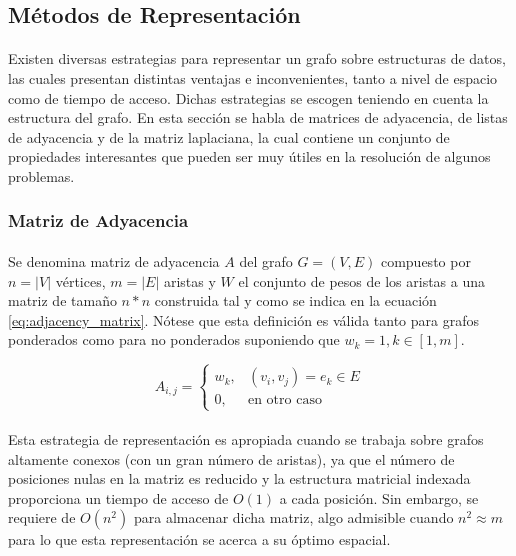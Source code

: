 \documentclass{subfiles}
\begin{document}
      \subsection{Métodos de Representación}
      \label{sec:representation_methods}

        \paragraph{}
        Existen diversas estrategias para representar un grafo sobre estructuras de datos, las cuales presentan distintas ventajas e inconvenientes, tanto a nivel de espacio como de tiempo de acceso. Dichas estrategias se escogen teniendo en cuenta la estructura del grafo. En esta sección se habla de matrices de adyacencia, de listas de adyacencia y de la matriz laplaciana, la cual contiene un conjunto de propiedades interesantes que pueden ser muy útiles en la resolución de algunos problemas.

        \subsubsection{Matriz de Adyacencia}
        \label{sec:adjacency_matrix}

          \paragraph{}
          Se denomina matriz de adyacencia $A$ del grafo $G = (V,E)$ compuesto por $n=|V|$ vértices, $m=|E|$ aristas y $W$ el conjunto de pesos de los aristas a una matriz de tamaño $n*n$ construida tal y como se indica en la ecuación \eqref{eq:adjacency_matrix}. Nótese que esta definición es válida tanto para grafos ponderados como para no ponderados suponiendo que $w_k = 1, k \in [1, m]$.

          \begin{equation}
          \label{eq:adjacency_matrix}
            A_{i,j} =
              \begin{cases}
                w_k,  & (v_i, v_j) = e_k \in E\\
                0,    &\text{en otro caso}
              \end{cases}
          \end{equation}

          \paragraph{}
          Esta estrategia de representación es apropiada cuando se trabaja sobre grafos altamente conexos (con un gran número de aristas), ya que el número de posiciones nulas en la matriz es reducido y la estructura matricial indexada proporciona un tiempo de acceso de $O(1)$ a cada posición. Sin embargo, se requiere de $O(n^2)$ para almacenar dicha matriz, algo admisible cuando $n^2 \approx m$ para lo que esta representación se acerca a su óptimo espacial.
\end{document}
